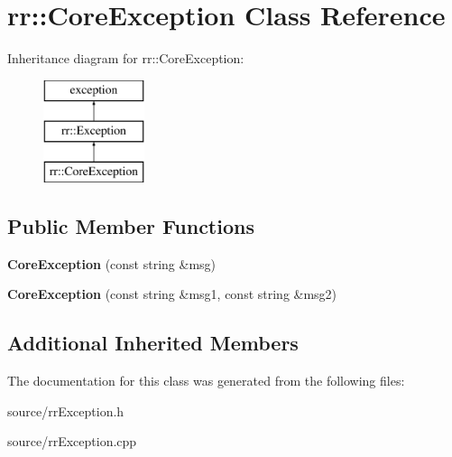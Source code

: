 \hypertarget{classrr_1_1_core_exception}{\section{rr\-:\-:Core\-Exception Class Reference}
\label{classrr_1_1_core_exception}
}
Inheritance diagram for rr\-:\-:Core\-Exception\-:\begin{figure}[H]
\begin{center}
\leavevmode
\includegraphics[height=3.000000cm]{classrr_1_1_core_exception}
\end{center}
\end{figure}
\subsection*{Public Member Functions}
\begin{DoxyCompactItemize}
\item 
\hypertarget{classrr_1_1_core_exception_aa5fae377d761664916e618a671512435}{{\bfseries Core\-Exception} (const string \&msg)}\label{classrr_1_1_core_exception_aa5fae377d761664916e618a671512435}

\item 
\hypertarget{classrr_1_1_core_exception_ae3db9042e1f7db934a2710a87649f4ff}{{\bfseries Core\-Exception} (const string \&msg1, const string \&msg2)}\label{classrr_1_1_core_exception_ae3db9042e1f7db934a2710a87649f4ff}

\end{DoxyCompactItemize}
\subsection*{Additional Inherited Members}


The documentation for this class was generated from the following files\-:\begin{DoxyCompactItemize}
\item 
source/rr\-Exception.\-h\item 
source/rr\-Exception.\-cpp\end{DoxyCompactItemize}
